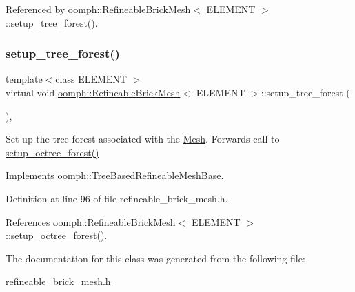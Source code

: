 Referenced by oomph\+::\+Refineable\+Brick\+Mesh$<$ E\+L\+E\+M\+E\+N\+T $>$\+::setup\+\_\+tree\+\_\+forest().

\mbox{\label{classoomph_1_1RefineableBrickMesh_afdb7af23886c1088ce9dcc855028fb84}} 
\subsubsection{\texorpdfstring{setup\+\_\+tree\+\_\+forest()}{setup\_tree\_forest()}}
{\footnotesize\ttfamily template$<$class E\+L\+E\+M\+E\+NT $>$ \\
virtual void \hyperlink{classoomph_1_1RefineableBrickMesh}{oomph\+::\+Refineable\+Brick\+Mesh}$<$ E\+L\+E\+M\+E\+NT $>$\+::setup\+\_\+tree\+\_\+forest (\begin{DoxyParamCaption}{ }\end{DoxyParamCaption})\hspace{0.3cm}{\ttfamily [inline]}, {\ttfamily [virtual]}}



Set up the tree forest associated with the \hyperlink{classoomph_1_1Mesh}{Mesh}. Forwards call to \hyperlink{classoomph_1_1RefineableBrickMesh_a7488ae090e09e3f1e01b20a2c2c7a188}{setup\+\_\+octree\+\_\+forest()} 



Implements \hyperlink{classoomph_1_1TreeBasedRefineableMeshBase_aab7cbaa680b2258f2b1eea5de6bbe605}{oomph\+::\+Tree\+Based\+Refineable\+Mesh\+Base}.



Definition at line 96 of file refineable\+\_\+brick\+\_\+mesh.\+h.



References oomph\+::\+Refineable\+Brick\+Mesh$<$ E\+L\+E\+M\+E\+N\+T $>$\+::setup\+\_\+octree\+\_\+forest().



The documentation for this class was generated from the following file\+:\begin{DoxyCompactItemize}
\item 
\hyperlink{refineable__brick__mesh_8h}{refineable\+\_\+brick\+\_\+mesh.\+h}\end{DoxyCompactItemize}

